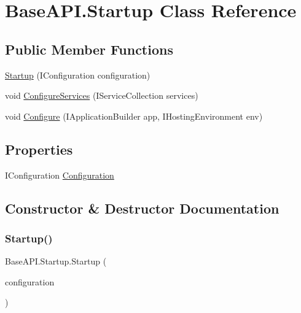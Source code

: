 \hypertarget{class_base_a_p_i_1_1_startup}{}\section{Base\+A\+P\+I.\+Startup Class Reference}
\label{class_base_a_p_i_1_1_startup}
\subsection*{Public Member Functions}
\begin{DoxyCompactItemize}
\item 
\mbox{\hyperlink{class_base_a_p_i_1_1_startup_ab192a2413de842aa3eb4de09437cc1a0}{Startup}} (I\+Configuration configuration)
\item 
void \mbox{\hyperlink{class_base_a_p_i_1_1_startup_a7ab4aad9aeb84d3d30173f614f7ac4d8}{Configure\+Services}} (I\+Service\+Collection services)
\item 
void \mbox{\hyperlink{class_base_a_p_i_1_1_startup_ae23537a591741af2a1f5373940dd57aa}{Configure}} (I\+Application\+Builder app, I\+Hosting\+Environment env)
\end{DoxyCompactItemize}
\subsection*{Properties}
\begin{DoxyCompactItemize}
\item 
I\+Configuration \mbox{\hyperlink{class_base_a_p_i_1_1_startup_aa0f28c8943cbe92fd297cf532576e172}{Configuration}}
\end{DoxyCompactItemize}


\subsection{Constructor \& Destructor Documentation}
\mbox{\label{class_base_a_p_i_1_1_startup_ab192a2413de842aa3eb4de09437cc1a0}} 
\subsubsection{\texorpdfstring{Startup()}{Startup()}}
{\footnotesize\ttfamily Base\+A\+P\+I.\+Startup.\+Startup (\begin{DoxyParamCaption}\item[{I\+Configuration}]{configuration }\end{DoxyParamCaption})}



